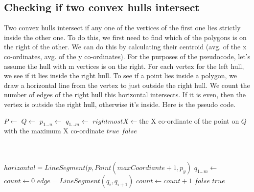 \documentclass{article}
\begin{document}
\subsection{Checking if two convex hulls intersect}

Two convex hulls intersect if any one of the vertices of the first one lies strictly inside the other one. To do this, we first need to find which of the polygons is on the right of the other. We can do this by calculating their centroid (avg. of the x co-ordinates, avg. of the y co-ordinates). For the purposes of the pseudocode, let's assume the hull with m vertices is on the right. For each vertex for the left hull, we see if it lies inside the right hull. To see if a point lies inside a polygon, we draw a horizontal line from the vertex to just outside the right hull. We count the number of edges of the right hull this horizontal intersects. If it is even, then the vertex is outside the right hull, otherwise it's inside. Here is the pseudo code.
\newline
\begin{algorithmic}
	\State $P \gets  $ 
	\State $Q \gets  $ 
	\State $p_{1 \dots n} \gets  $ 
	\State $q_{1 \dots m} \gets  $ 
	\State $rightmostX \gets ${the X co-ordinate of the point on $Q$ with the maximum X co-ordinate}
			\State \Return $true$
		\EndIf
	\EndFor 
	\State \Return $false$  
\EndFunction
\end{algorithmic}
\begin{algorithmic}
	 \\
	 \\
	\State $horizontal = LineSegment(p, Point(maxCoordiante + 1, p_y)$
	\State $q_{1 \dots m} \gets  $ 
	\State $count \gets 0$
		\State $edge = LineSegment (q_i, q_{i+1})$ 
			\State $count \gets count+1$
		\EndIf
	\EndFor
		\State \Return $false$
	\Else
		\State \Return $true$
	\EndIf
\EndFunction
\end{algorithmic}
\end{document}
